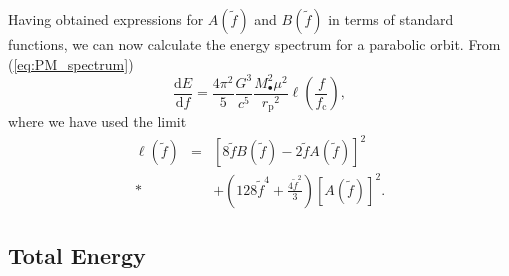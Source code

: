\documentclass[aps,prd,reprint,showpacs,groupedaddress]{revtex4-1}
\newcommand{\eqnref}[1]{(\ref{eq:#1})}
\newcommand{\sub}[1]{\ensuremath{_\text{#1}}}
\newcommand{\dd}{\ensuremath{\mathrm{d}}}
\newcommand{\diff}[2]{\ensuremath{\frac{\dd {#1}}{\dd {#2}}}}
\begin{document}
Having obtained expressions for $A(\tilde{f})$ and $B(\tilde{f})$ in terms of standard functions, we can now calculate the energy spectrum for a parabolic orbit. From \eqnref{PM_spectrum}
\begin{equation}
\diff{E}{f} = \frac{4\pi^2}{5}\frac{G^3}{c^5}\frac{M_\bullet^2\mu^2}{r\sub{p}^2}\ell\left(\frac{f}{f\sub{c}}\right),
\label{eq:PM_dEdf}
\end{equation}
where we have used the limit
\begin{eqnarray}
\ell(\tilde{f}) & = & \left[8\tilde{f}B(\tilde{f}) - 2\tilde{f}A(\tilde{f})\right]^2 \nonumber \\ *
 & & + \left(128\tilde{f}^4 + \frac{4\tilde{f}^2}{3}\right)\left[A(\tilde{f})\right]^2.
\end{eqnarray}

\subsection{Total Energy}
\end{document}
